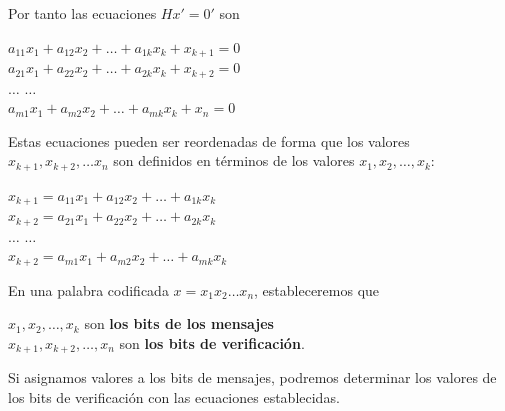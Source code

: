 \documentclass{beamer}
\theoremstyle{plain}
\theoremstyle{example}
\theoremstyle{example}
\begin{document}
\begin{frame}  \footnotesize  

Por tanto las ecuaciones $Hx' = 0'$ son

\begin{center}
$a_{11} x_1+ a_{12} x_2 + \ldots + a_{1k} x_k + x_{k+1} =0$\\
$a_{21} x_1+ a_{22} x_2 + \ldots + a_{2k} x_k + x_{k+2} =0$\\
$\ldots$ $\ldots$\\
$a_{m1} x_1+ a_{m2} x_2 + \ldots + a_{mk} x_k + x_{n} =0$\\
\end{center}

Estas ecuaciones pueden ser reordenadas de forma que los valores  $x_{k+1},x_{k+2}, \ldots x_n$ son definidos en términos de los valores $x_1,x_2,\ldots,x_k$: 

\begin{center}
$ x_{k+1} = a_{11} x_1+ a_{12} x_2 + \ldots + a_{1k} x_k$\\
$ x_{k+2} = a_{21} x_1+ a_{22} x_2 + \ldots + a_{2k} x_k$\\
$\ldots$ $\ldots$\\
$x_{k+2} = a_{m1} x_1+ a_{m2} x_2 + \ldots + a_{mk} x_k$\\
\end{center}

En una palabra codificada $x = x_1x_2 \ldots x_n$, estableceremos que

\begin{center}
$x_1,x_2,\ldots, x_k$ son \textbf{los bits de los mensajes}\\
$x_{k+1},x_{k+2},\ldots, x_n$ son \textbf{los bits de verificación}.
\end{center}

Si asignamos valores a los bits de mensajes, podremos determinar los valores de los bits de verificación con las ecuaciones establecidas. 

\end{frame} 


\end{document}
